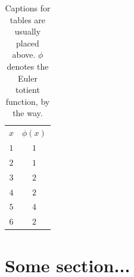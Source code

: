 \begin{table}[ht!]
    \centering
    \caption{Captions for tables are usually placed above. $\phi$ denotes the Euler totient function, by the way.}
    \label{tab:test}
    \begin{tabular}{c|c}
        $x$ & $\phi(x)$ \\
        \hhline{=|=}
        $1$ & $1$ \\
        \hline
        $2$ & $1$ \\
        \hline
        $3$ & $2$ \\
        \hline
        $4$ & $2$ \\
        \hline
        $5$ & $4$ \\
        \hline
        $6$ & $2$
    \end{tabular}
\end{table}
	
\section{Some section...}
\label{sec:some-section}

\lipsum
